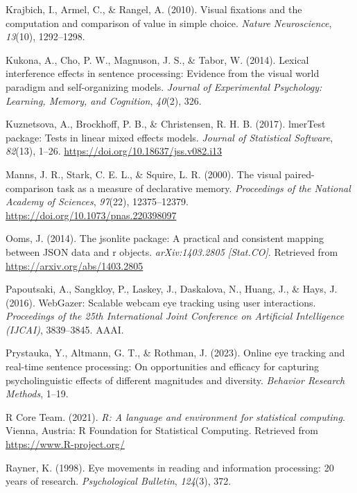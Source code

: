 \documentclass[
  man,floatsintext]{apa6}
\newlength{\cslhangindent}
\newenvironment{CSLReferences}[2] %
 {\begin{list}{}{%
  \setlength{\itemindent}{0pt}
  \setlength{\leftmargin}{0pt}
  \setlength{\parsep}{0pt}
  \ifodd #1
   \setlength{\leftmargin}{\cslhangindent}
   \setlength{\itemindent}{-1\cslhangindent}
  \fi
  \setlength{\itemsep}{#2\baselineskip}}}
 {\end{list}}
\begin{document}
\begin{CSLReferences}{1}{0}
Krajbich, I., Armel, C., \& Rangel, A. (2010). Visual fixations and the computation and comparison of value in simple choice. \emph{Nature Neuroscience}, \emph{13}(10), 1292--1298.

Kukona, A., Cho, P. W., Magnuson, J. S., \& Tabor, W. (2014). Lexical interference effects in sentence processing: Evidence from the visual world paradigm and self-organizing models. \emph{Journal of Experimental Psychology: Learning, Memory, and Cognition}, \emph{40}(2), 326.

Kuznetsova, A., Brockhoff, P. B., \& Christensen, R. H. B. (2017). {lmerTest} package: Tests in linear mixed effects models. \emph{Journal of Statistical Software}, \emph{82}(13), 1--26. \url{https://doi.org/10.18637/jss.v082.i13}

Manns, J. R., Stark, C. E. L., \& Squire, L. R. (2000). The visual paired-comparison task as a measure of declarative memory. \emph{Proceedings of the National Academy of Sciences}, \emph{97}(22), 12375--12379. \url{https://doi.org/10.1073/pnas.220398097}

Ooms, J. (2014). The jsonlite package: A practical and consistent mapping between JSON data and r objects. \emph{arXiv:1403.2805 {[}Stat.CO{]}}. Retrieved from \url{https://arxiv.org/abs/1403.2805}

Papoutsaki, A., Sangkloy, P., Laskey, J., Daskalova, N., Huang, J., \& Hays, J. (2016). {WebGazer}: {Scalable} webcam eye tracking using user interactions. \emph{Proceedings of the 25th International Joint Conference on Artificial Intelligence ({IJCAI})}, 3839--3845. {AAAI}.

Prystauka, Y., Altmann, G. T., \& Rothman, J. (2023). Online eye tracking and real-time sentence processing: On opportunities and efficacy for capturing psycholinguistic effects of different magnitudes and diversity. \emph{Behavior Research Methods}, 1--19.

R Core Team. (2021). \emph{R: A language and environment for statistical computing}. Vienna, Austria: R Foundation for Statistical Computing. Retrieved from \url{https://www.R-project.org/}

Rayner, K. (1998). Eye movements in reading and information processing: 20 years of research. \emph{Psychological Bulletin}, \emph{124}(3), 372.


\end{CSLReferences}
\end{document}
